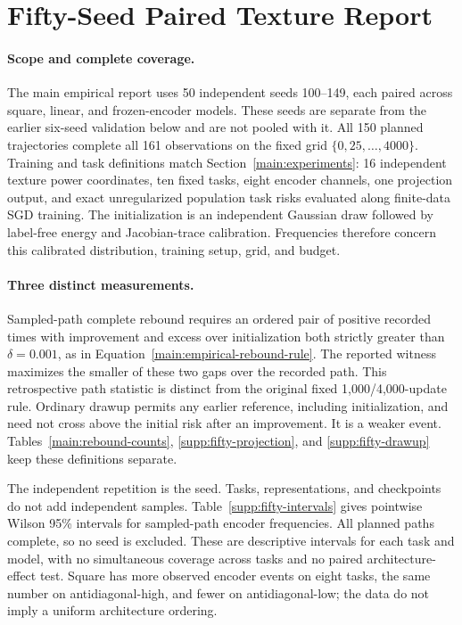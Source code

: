 \section{Fifty-Seed Paired Texture Report}
\label{supp:texture-fifty}
\paragraph{Scope and complete coverage.}
The main empirical report uses 50 independent seeds 100--149, each paired across square, linear, and frozen-encoder models. These seeds are separate from the earlier six-seed validation below and are not pooled with it. All 150 planned trajectories complete all 161 observations on the fixed grid $\{0,25,\ldots,4000\}$. Training and task definitions match Section~\ref{main:experiments}: 16 independent texture power coordinates, ten fixed tasks, eight encoder channels, one projection output, and exact unregularized population task risks evaluated along finite-data SGD training. The initialization is an independent Gaussian draw followed by label-free energy and Jacobian-trace calibration. Frequencies therefore concern this calibrated distribution, training setup, grid, and budget.

\paragraph{Three distinct measurements.}
Sampled-path complete rebound requires an ordered pair of positive recorded times with improvement and excess over initialization both strictly greater than $\delta=0.001$, as in Equation~\eqref{main:empirical-rebound-rule}. The reported witness maximizes the smaller of these two gaps over the recorded path. This retrospective path statistic is distinct from the original fixed 1,000/4,000-update rule. Ordinary drawup permits any earlier reference, including initialization, and need not cross above the initial risk after an improvement. It is a weaker event. Tables~\ref{main:rebound-counts}, \ref{supp:fifty-projection}, and \ref{supp:fifty-drawup} keep these definitions separate.

The independent repetition is the seed. Tasks, representations, and checkpoints do not add independent samples. Table~\ref{supp:fifty-intervals} gives pointwise Wilson 95\% intervals for sampled-path encoder frequencies. All planned paths complete, so no seed is excluded. These are descriptive intervals for each task and model, with no simultaneous coverage across tasks and no paired architecture-effect test. Square has more observed encoder events on eight tasks, the same number on antidiagonal-high, and fewer on antidiagonal-low; the data do not imply a uniform architecture ordering.

